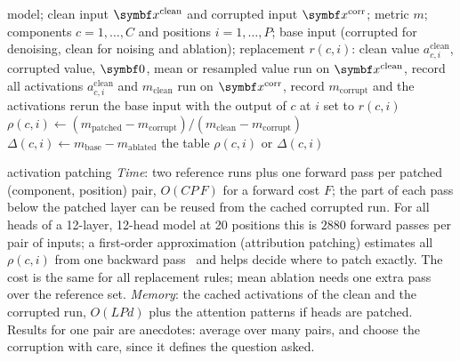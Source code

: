 \documentclass[11pt]{article}
\begin{document}
\begin{algorithm}[htbp]
\caption{Activation patching and ablation over a set of components}\label{alg:patch}
\begin{algorithmic}[1]
\Require model; clean input $\x^{\mathrm{clean}}$ and corrupted input $\x^{\mathrm{corr}}$; metric $m$; components
  $c = 1, \dots, C$ and positions $i = 1, \dots, P$; base input (corrupted for denoising, clean for noising and ablation);
  replacement $r(c, i)$: clean value $a^{\mathrm{clean}}_{c,i}$, corrupted value, $\vect{0}$, mean or resampled value
  \State run on $\x^{\mathrm{clean}}$, record all activations $a^{\mathrm{clean}}_{c,i}$ and $m_{\mathrm{clean}}$ 
  \State run on $\x^{\mathrm{corr}}$, record $m_{\mathrm{corrupt}}$ and the activations
    \State rerun the base input with the output of $c$ at $i$ set to $r(c, i)$ 
      \State $\rho(c, i) \gets (m_{\mathrm{patched}} - m_{\mathrm{corrupt}})/(m_{\mathrm{clean}} - m_{\mathrm{corrupt}})$
    \Else
      \State $\Delta(c, i) \gets m_{\mathrm{base}} - m_{\mathrm{ablated}}$ 
    \EndIf
  \EndFor
  \State \Return the table $\rho(c, i)$ or $\Delta(c, i)$ 
\EndFunction
\end{algorithmic}
\end{algorithm}

\begin{runtime}{activation patching}
\emph{Time}: two reference runs plus one forward pass per patched (component, position) pair, $O(CP\,F)$ for a forward
cost $F$; the part of each pass below the patched layer can be reused from the cached corrupted run. For all heads of a
12-layer, 12-head model at 20 positions this is $2880$ forward passes per pair of inputs; a first-order approximation
(attribution patching) estimates all $\rho(c, i)$ from one backward pass~\cite{heimersheim2024} and helps decide where to
patch exactly. The cost is the same for all replacement rules; mean ablation needs one extra pass over the reference
set. \emph{Memory}: the cached activations of the clean and the corrupted run, $O(LPd)$
plus the attention patterns if heads are patched. Results for one pair are anecdotes: average over many pairs, and
choose the corruption with care, since it defines the question asked.
\end{runtime}
\end{document}
